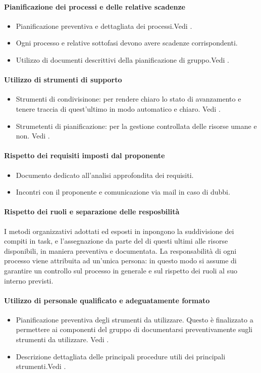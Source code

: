 \documentclass[12pt,a4paper]{article}
\begin{document}
\paragraph{Pianificazione dei processi e delle relative scadenze}
\begin{itemize}
	\item Pianificazione preventiva e dettagliata dei processi.Vedi \PdP{}.
	\item Ogni processo e relative sottofasi devono avere scadenze corrispondenti.
	\item Utilizzo di documenti descrittivi della pianificazione di gruppo.Vedi \PdP{}.
\end{itemize}
\paragraph{Utilizzo di strumenti di supporto}
\begin{itemize}
	\item Strumenti di condivisinone: per rendere chiaro lo stato di avanzamento e tenere traccia di quest'ultimo in modo automatico e chiaro. Vedi \NdP{}.
	\item Strumetenti di pianificazione: per la gestione controllata delle risorse umane e non. Vedi \NdP{}.
\end{itemize}
\paragraph{Rispetto dei requisiti imposti dal proponente \Zucchetti}
\begin{itemize}
	\item Documento dedicato all'analisi approfondita dei requisiti.
	\item Incontri con il proponente e comunicazione via mail in caso di dubbi.
\end{itemize}
\paragraph{Rispetto dei ruoli e separazione delle resposbilità}
I metodi organizzativi adottati ed esposti in \NdP inpongono la suddivisione dei compiti in task, e l'assegnazione da parte del \PM di questi ultimi alle risorse disponibili, in maniera preventiva e documentata. 
La responsabilità di ogni processo viene attribuita ad un'unica persona: in questo modo si assume di garantire un controllo sul processo in generale e sul rispetto dei ruoli al suo interno previsti.
\paragraph{Utilizzo di personale qualificato e adeguatamente formato}
\begin{itemize}
	\item Pianificazione preventiva degli strumenti da utilizzare. Questo è finalizzato a permettere ai componenti del gruppo di documentarsi preventivamente sugli strumenti da utilizzare. Vedi \NdP{}.
	\item Descrizione dettagliata delle principali procedure utili dei principali strumenti.Vedi \NdP{}.
\end{itemize}
\end{document}
